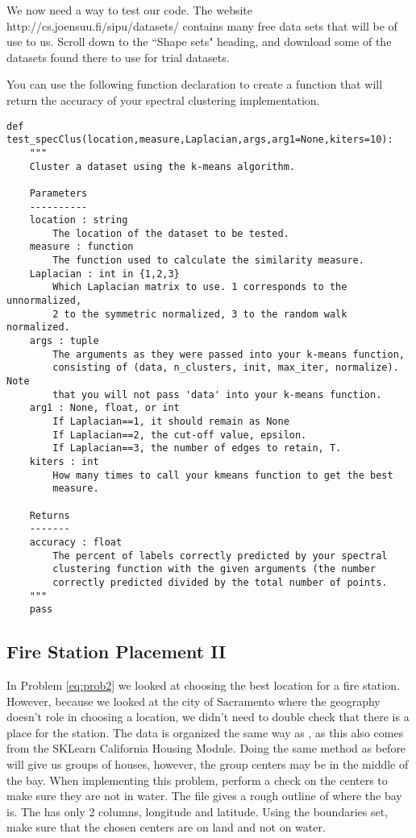 We now need a way to test our code.  The website http://cs.joensuu.fi/sipu/datasets/ contains many free data sets that will be of use to us.  Scroll down to the ``Shape sets" heading, and download some of the datasets found there to use for trial datasets.

You can use the following function declaration to create a function that will return the accuracy of your spectral clustering implementation.
\begin{lstlisting}
def test_specClus(location,measure,Laplacian,args,arg1=None,kiters=10):
    """
    Cluster a dataset using the k-means algorithm.

    Parameters
    ----------
    location : string
        The location of the dataset to be tested.
    measure : function
        The function used to calculate the similarity measure.
    Laplacian : int in {1,2,3}
        Which Laplacian matrix to use. 1 corresponds to the unnormalized,
        2 to the symmetric normalized, 3 to the random walk normalized.
    args : tuple
        The arguments as they were passed into your k-means function,
        consisting of (data, n_clusters, init, max_iter, normalize). Note
        that you will not pass 'data' into your k-means function.
    arg1 : None, float, or int
        If Laplacian==1, it should remain as None
        If Laplacian==2, the cut-off value, epsilon.
        If Laplacian==3, the number of edges to retain, T.
    kiters : int
        How many times to call your kmeans function to get the best
        measure.

    Returns
    -------
    accuracy : float
        The percent of labels correctly predicted by your spectral
        clustering function with the given arguments (the number
        correctly predicted divided by the total number of points.
    """
    pass
\end{lstlisting}

\subsection*{Fire Station Placement II}
In Problem \ref{eq:prob2} we looked at choosing the best location for a fire station. 
However, because we looked at the city of Sacramento where the geography doesn't role in choosing a location, we didn't need to double check that there is a place for the station.
The  data is organized the same way as , as this also comes from the SKLearn California Housing Module.
Doing the same method as before will give us groups of houses, however, the group centers may be in the middle of the bay.
When implementing this problem, perform a check on the centers to make sure they are not in water. 
The file  gives a rough outline of where the bay is.
The  has only 2 columns, longitude and latitude.
Using the boundaries set, make sure that the chosen centers are on land and not on water.

